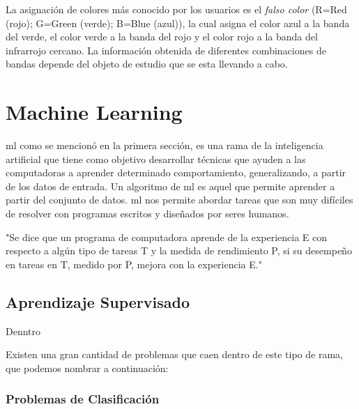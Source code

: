 La asignación de colores más conocido por los usuarios es el \textit{falso color} (R=Red (rojo); G=Green (verde); B=Blue (azul)), la cual asigna el color azul a la banda del verde, el color verde a la banda del rojo y el color rojo a la banda del infrarrojo cercano. La información obtenida de diferentes combinaciones de bandas depende del objeto de estudio que se esta llevando a cabo.






\section{Machine Learning}\label{sec:machinelaerning}

\ac{ml} como se mencionó en la primera sección, es una rama de la inteligencia artificial que tiene como objetivo desarrollar técnicas que ayuden a las computadoras a aprender determinado comportamiento, generalizando, a partir de los datos de entrada. Un algoritmo de \ac{ml} es aquel que permite aprender a partir del conjunto de datos. \ac{ml} nos permite abordar tareas que son muy difíciles de resolver con programas escritos y diseñados por seres humanos.

"Se dice que un programa de computadora aprende de la experiencia E con respecto a algún tipo de tareas T y la medida de rendimiento P, si su desempeño en tareas en T, medido por P, mejora con la experiencia E." \citep{Mitchell}

\subsection{Aprendizaje Supervisado}\label{sub:aprendizaje_supervisado}

Denntro

Existen una gran cantidad de problemas que caen dentro de este tipo de rama, que podemos nombrar a continuación:

\subsubsection{Problemas de Clasificación}

